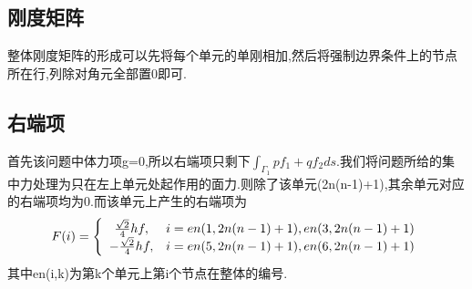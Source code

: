 \documentclass[UTF8]{ctexart}
\begin{document}
\subsection{刚度矩阵}
整体刚度矩阵的形成可以先将每个单元的单刚相加,然后将强制边界条件上的节点所在行,列除对角元全部置0即可.
\subsection{右端项}
首先该问题中体力项g=0,所以右端项只剩下$\int_{\Gamma_1}pf_1 +qf_2ds$.我们将问题所给的集中力处理为只在左上单元处起作用的面力.则除了该单元(2n(n-1)+1),其余单元对应的右端项均为0.而该单元上产生的右端项为
\begin{equation}\notag
  F(i) = \left\{
  \begin{array}{cc}
    \frac{\sqrt{2}}{4}hf, & i=en(1,2n(n-1)+1),en(3,2n(n-1)+1) \\
    -\frac{\sqrt{2}}{4}hf, & i=en(5,2n(n-1)+1),en(6,2n(n-1)+1)
  \end{array}
  \right.  
\end{equation}
其中en(i,k)为第k个单元上第i个节点在整体的编号.
\end{document}
